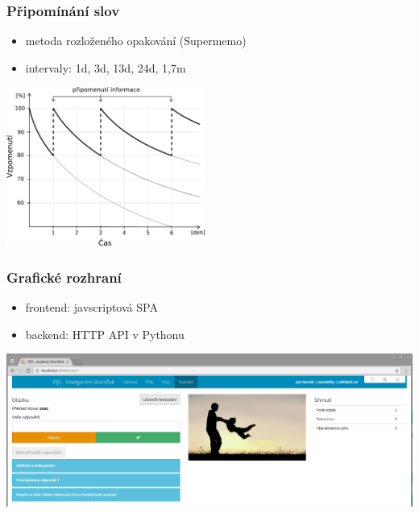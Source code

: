 \begin{frame}[t]
    \frametitle{Připomínání slov}
    \begin{itemize}
        \item metoda rozloženého opakování (Supermemo)
        \item intervaly: 1d, 3d, 13d, 24d, 1,7m 
    \end{itemize}
    \begin{center}
        \includegraphics[width=6.5cm]{./img/forgetting-curve.pdf}\\
    \end{center}
\end{frame}

\begin{frame}[t]
    \frametitle{Grafické rozhraní}
    \begin{itemize}
        \item frontend: javscriptová SPA
        \item backend: HTTP API v Pythonu
    \end{itemize}
    \begin{center}
        \includegraphics[width=\textwidth]{./img/gui.png}\\
    \end{center}
\end{frame}


